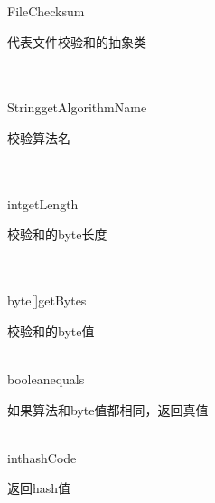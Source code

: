 \begin{XeClass}{FileChecksum}
   
 代表文件校验和的抽象类

  \begin{XeMethod}{\XePublic\\ \XeAbstract\\ }{String}{getAlgorithmName}
       
 校验算法名 

  \end{XeMethod}

  \begin{XeMethod}{\XePublic\\ \XeAbstract\\ }{int}{getLength}
       
 校验和的byte长度 

  \end{XeMethod}

  \begin{XeMethod}{\XePublic\\ \XeAbstract\\ }{byte[]}{getBytes}
       
 校验和的byte值

  \end{XeMethod}

  \begin{XeMethod}{\XePublic\\ }{boolean}{equals}
       
 如果算法和byte值都相同，返回真值

  \end{XeMethod}

  \begin{XeMethod}{\XePublic\\ }{int}{hashCode}
       
 返回hash值

  \end{XeMethod}

\end{XeClass}
